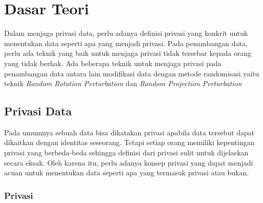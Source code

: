 \chapter{Dasar Teori}
\label{chap:teori}

Dalam menjaga privasi data, perlu adanya definisi privasi yang konkrit untuk menentukan data seperti apa yang menjadi privasi. Pada penambangan data, perlu ada teknik yang baik untuk menjaga privasi tidak tersebar kepada orang yang tidak berhak. Ada beberapa teknik untuk menjaga privasi pada penambangan data antara lain modifikasi data dengan metode randomisasi yaitu teknik \textit{Random Rotation Perturbation} dan \textit{Random Projection Perturbation}


\section{Privasi Data}
\label{sec:privasidata} 

Pada umumnya sebuah data bisa dikatakan privasi apabila data tersebut dapat dikaitkan dengan identitas seseorang. Tetapi setiap orang memiliki kepentingan privasi yang berbeda-beda sehingga definisi dari privasi sulit untuk dijelaskan secara eksak. Oleh karena itu, perlu adanya konsep privasi yang dapat menjadi acuan untuk menentukan data seperti apa yang termasuk privasi atau bukan.

\subsection{Privasi}
\label{subsec:privasi}

